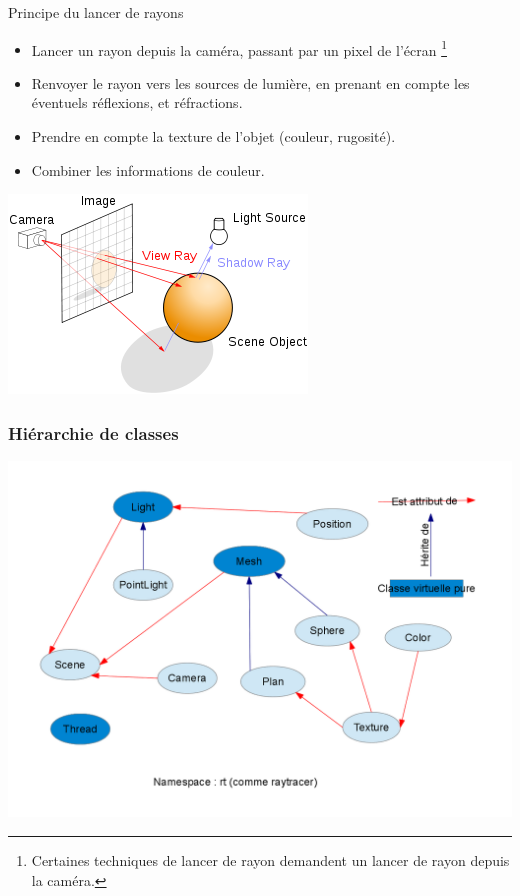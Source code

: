 \begin{frame}{Principe du lancer de rayons}

\begin{itemize}
\item Lancer un rayon depuis la caméra, passant par un pixel de l'écran \footnote{Certaines techniques de lancer de rayon demandent un lancer de rayon depuis la caméra.}
\item Renvoyer le rayon vers les sources de lumière, en prenant en compte les éventuels réflexions, et réfractions.
\item Prendre en compte la texture de l'objet (couleur, rugosité).
\item Combiner les informations de couleur.
\end{itemize}

\begin{center}
\includegraphics[scale=0.5]{raytracing.png}
\end{center}
\end{frame}



\begin{frame}
\frametitle{Hiérarchie de classes}

\begin{center}
\includegraphics[scale=0.3]{hierarchie.png}
\end{center}

\end{frame}


